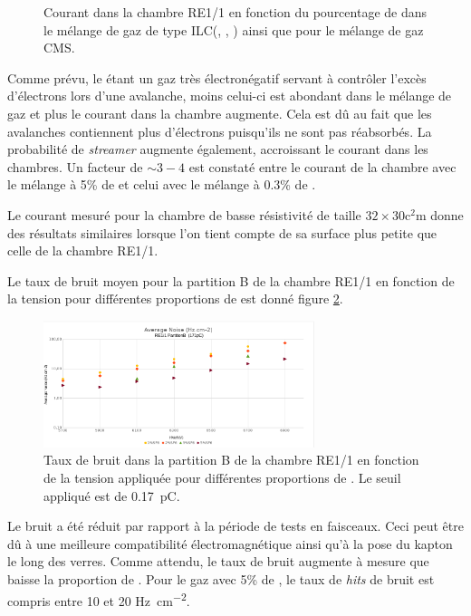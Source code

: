 \begin{figure}[ht!]
	\centering
	\captionsetup{type=figure}\caption{Courant dans la chambre RE1/1 en fonction du pourcentage de  dans le mélange de gaz de type ILC(, , ) ainsi que pour le mélange de gaz CMS.}
	\label{CurrentDOME}
\end{figure}

Comme prévu, le  étant un gaz très électronégatif servant à contrôler l'excès d'électrons lors d'une avalanche, moins celui-ci est abondant dans le mélange de gaz et plus le courant dans la chambre augmente. Cela est dû au fait que les avalanches contiennent plus d'électrons puisqu'ils ne sont pas réabsorbés. La probabilité de \textit{streamer} augmente également, accroissant le courant dans les chambres. Un facteur de $\sim 3-4$ est constaté entre le courant de la chambre avec le mélange à 5\% de  et celui avec le mélange à \num{0.3}\% de .

Le courant mesuré pour la chambre de basse résistivité de taille $\num{32}\times\num{30}\si{\square\centi\meter}$ donne des résultats similaires lorsque l'on tient compte de sa surface plus petite que celle de la chambre RE1/1.

\newpage
Le taux de bruit moyen pour la partition B de la chambre RE1/1 en fonction de la tension pour différentes proportions de  est donné figure \ref{bruitB}.

 
 \begin{figure}[ht!]
 	\centering
 	\includegraphics[width=0.705\textwidth]{GLA/NoisvsSF6.png}
 	\captionsetup{type=figure}\caption{Taux de bruit dans la partition B de la chambre RE1/1 en fonction de la tension appliquée pour différentes proportions de . Le seuil appliqué est de \SI{0.17}{\pico\coulomb}.}
 	\label{bruitB}
 \end{figure}
 
 Le bruit a été réduit par rapport à la période de tests en faisceaux. Ceci peut être dû à une meilleure compatibilité électromagnétique ainsi qu'à la pose du kapton le long des verres. Comme attendu, le taux de bruit augmente à mesure que baisse la proportion de . Pour le gaz avec 5\% de , le taux de \textit{hits} de bruit est compris entre \num{10} et \num{20} \si{\hertz\per\square\centi\meter}.
 
